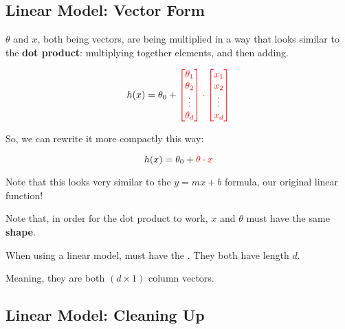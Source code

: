     \subsection{Linear Model: Vector Form}
        
        $\theta$ and $x$, both being vectors, are being multiplied in a way that looks similar to the \textbf{dot product}: multiplying together elements, and then adding.
        
        \begin{equation}
            h(x) = \theta_0 +
            \textcolor{red}{
                \begin{bmatrix}
                    \theta_1 \\ \theta_2 \\ \vdots \\ \theta_d
                \end{bmatrix}
                \cdot
                \begin{bmatrix}
                    x_1 \\ x_2 \\ \vdots \\ x_d
                \end{bmatrix}
            }
        \end{equation}
        
        So, we can rewrite it more compactly this way:
        
        \begin{equation}
            h(x) = \theta_0 + \textcolor{red}{\theta \cdot x} 
        \end{equation}
        
        Note that this looks very similar to the $y=mx+b$ formula, our original linear function!
        
        Note that, in order for the dot product to work, $x$ and $\theta$ must have the same \textbf{shape}.\\
        
        \begin{concept}
            When using a linear model,  must have the . They both have length $d$.
            
            Meaning, they are both $(d \times 1)$ column vectors.
        \end{concept}
        
    \subsection{Linear Model: Cleaning Up}
        
